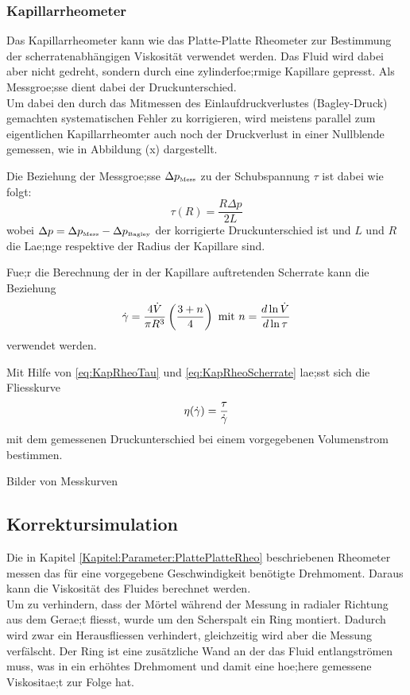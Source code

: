 \subsubsection{Kapillarrheometer}
Das Kapillarrheometer kann wie das Platte-Platte Rheometer zur Bestimmung der scherratenabhängigen Viskosität verwendet werden. Das Fluid wird dabei aber nicht gedreht, sondern durch eine zylinderfoe;rmige Kapillare gepresst. Als Messgroe;sse dient dabei der Druckunterschied.\\
Um dabei den durch das Mitmessen des Einlaufdruckverlustes (Bagley-Druck) gemachten systematischen Fehler zu korrigieren, wird meistens parallel zum eigentlichen Kapillarrheomter auch noch der Druckverlust in einer Nullblende gemessen, wie in Abbildung (x) dargestellt. 

Die Beziehung der Messgroe;sse $\Delta p_{\mbox{\tiny Mess}}$ zu der Schubspannung $\tau$ ist dabei wie folgt:
\begin{equation}
    \label{eq:KapRheoTau}
    \tau\left( R \right) = \frac{R \Delta p}{2L}
\end{equation}
wobei $\Delta p = \Delta p_{\mbox{\tiny Mess}} -\Delta p_{\mbox{\tiny Bagley}}$ der korrigierte Druckunterschied ist und $L$ und $R$ die Lae;nge respektive der Radius der Kapillare sind.

Fue;r die Berechnung der in der Kapillare auftretenden Scherrate kann die Beziehung
\begin{equation}
    \label{eq:KapRheoScherrate}
    \dot\gamma = \frac{4 \dot{V}}{\pi R^3}\left( \frac{3+n}{4} \right) \mbox{ mit } n=\frac{d \ln \dot{V}}{d\ln\tau}
\end{equation}
verwendet werden.

Mit Hilfe von \eqref{eq:KapRheoTau} und \eqref{eq:KapRheoScherrate} lae;sst sich die Fliesskurve 
\begin{equation}
    \eta(\dot\gamma) = \frac{\tau}{\dot\gamma}
\end{equation}
mit dem gemessenen Druckunterschied bei einem vorgegebenen Volumenstrom bestimmen.
%
\begin{todocontent}
    \1 Bilder von Messkurven
\end{todocontent}
%
\subsection{Korrektursimulation}
\label{Kapitel:Korrektursimulation}
Die in Kapitel \ref{Kapitel:Parameter:PlattePlatteRheo} beschriebenen Rheometer messen das für eine vorgegebene Geschwindigkeit benötigte Drehmoment. Daraus kann die Viskosität des Fluides berechnet werden.\\
Um zu verhindern, dass der Mörtel während der Messung in radialer Richtung aus dem Gerae;t fliesst, wurde um den Scherspalt ein Ring montiert. Dadurch wird zwar ein Herausfliessen verhindert, gleichzeitig wird aber die Messung verfälscht. Der Ring ist eine zusätzliche Wand an der das Fluid entlangströmen muss, was in ein erhöhtes Drehmoment und damit eine hoe;here gemessene Viskositae;t zur Folge hat.

